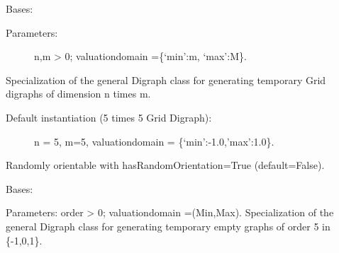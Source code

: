 \documentclass[letterpaper,10pt,english]{sphinxmanual}
\begin{document}
\begin{fulllineitems}
\label{techDoc:digraphs.GridDigraph}
Bases: {\hyperref[techDoc:digraphs.Digraph]{}}
\begin{description}
\item[{Parameters:}] \leavevmode
n,m \textgreater{} 0; valuationdomain =\{`min':m, `max':M\}.

\end{description}

Specialization of the general Digraph class for generating
temporary Grid digraphs of dimension n times m.
\begin{description}
\item[{Default instantiation (5 times 5 Grid Digraph):}] \leavevmode
n = 5, m=5, valuationdomain = \{`min':-1.0,'max':1.0\}.

\end{description}

Randomly orientable with hasRandomOrientation=True (default=False).

\begin{fulllineitems}
\label{techDoc:digraphs.GridDigraph.showShort}
\end{fulllineitems}


\end{fulllineitems}


\begin{fulllineitems}
\label{techDoc:digraphs.IndeterminateDigraph}
Bases: {\hyperref[techDoc:digraphs.Digraph]{}}

Parameters: order \textgreater{} 0; valuationdomain =(Min,Max).
Specialization of the general Digraph class for generating
temporary empty graphs of order 5 in \{-1,0,1\}.

\end{fulllineitems}

\end{document}

